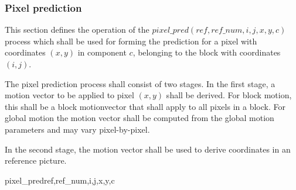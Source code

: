 \begin{comment}
The weighting factors we would like to use for unidirectionally 
redicted blocks in the scaling case
are $2W_1$ and $2W_2$ - the factor 2 takes into account that 
we're only adding in one prediction
value as against two for bidirectional prediction. These factors differ f
rom $W_1+W_2$, and hence
unidirectional prediction is incorrect when there are two references. 
Note, however, that we can
still perform prediction with the correct scaling values when we 
only have a single reference. Note
also that the value of $W_1+W_2$ was selected instead of 
$2^\RefsWeightPrecision$, which
would be equivalent in the interpolative case, as it gives a 
better approximation when the
weights do not sum to $2^\RefsWeightPrecision$.
\end{informative*}
\end{comment}

\subsubsection{Pixel prediction}
\label{pixelprediction}

This section defines the operation of the $pixel\_pred(ref, ref\_num, i, j, x, y, c)$ 
process which shall be used for forming the prediction for a pixel 
with coordinates $(x,y)$ in component $c$, belonging to the block with coordinates $(i,j)$.

The pixel prediction process shall consist of two stages. In the first stage, a motion vector
 to be applied to pixel $(x,y)$ shall be derived. For block motion, this shall be a block
 motionvector that shall apply to all pixels in a block. For global motion the motion
vector shall be computed from the global motion parameters and may vary pixel-by-pixel.

In the second stage, the motion vector shall be used to derive coordinates in an reference picture.

\begin{pseudo}{pixel\_pred}{ref,ref\_num,i,j,x,y,c}
\bsIF{\BlockData[j][i][global]==\false}
\bsELSE
\bsEND
{}
\bsEND
{}
\bsELSE
\bsEND
\end{pseudo}


